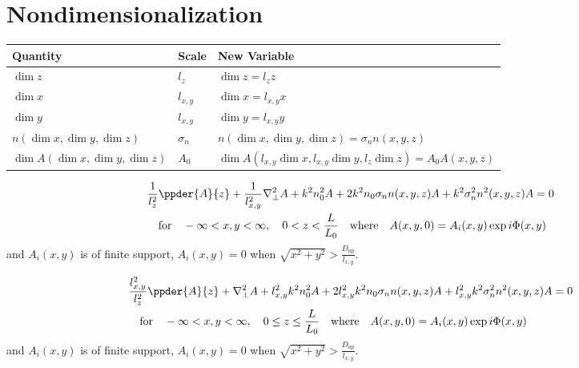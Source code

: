 \section{Nondimensionalization}
\begin{center}
\begin{tabular}{ |p{3cm}|p{2cm}|p{6cm}| }
\hline
\textbf{Quantity} & \textbf{Scale} & \textbf{New Variable}\\
\hline
\hline
$\dim{z}$                            & $l_{z}$    & $\dim{z} = l_{z} z$\\
\hline
$\dim{x}$                            & $l_{x,y}$  & $\dim{x} = l_{x,y} x$\\
\hline
$\dim{y}$                            & $l_{x,y}$  & $\dim{y} = l_{x,y} y$\\
\hline
$n(\dim{x}, \dim{y}, \dim{z})$       & $\sigma_n$ & $n(\dim{x}, \dim{y}, \dim{z}) = \sigma_n n(x,y,z)$\\
\hline
$\dim{A}(\dim{x}, \dim{y}, \dim{z})$ & $A_0$      & $\dim{A}(l_{x,y} \dim{x}, l_{x,y} \dim{y}, l_{z} \dim{z}) = A_0 A(x,y,z)$  \\
\hline
\end{tabular}
\end{center}

 \begin{equation}\label{EQ:helmholtz_equation_2}
 \begin{split}
   & \frac{1}{l_{z}^{2}} \ppder{A}{z} + \frac{1}{l_{x,y}^{2}} \nabla_{\perp}^2 A + k^2 n_0^2 A +  2 k^2 n_0 \sigma_n n(x,y,z) A + k^2 \sigma_n^2 n^2(x,y,z) A = 0 \\
   &\quad  \mbox{for}
   \quad -\infty < x,y < \infty, \quad 0 < z < \frac{L}{L_0} \quad  \mbox{where} \quad A(x,y,0) = A_{i}(x,y)\exp{i \Phi(x,y)}
 \end{split}
 \end{equation}
 and $A_{i}(x,y)$ is of finite support, \ie $A_{i}(x,y) = 0$ when $\sqrt{x^2 + y^2} > \frac{D_{ap}}{l_{x,y}}$.



\begin{equation}\label{EQ:helmholtz_equation_3}
\begin{split}
  & \frac{l_{x,y}^{2}}{l_{z}^{2}} \ppder{A}{z} + \nabla_{\perp}^2 A + l_{x,y}^{2} k^2 n_0^2 A 
  +  2 l_{x,y}^{2} k^2 n_0 \sigma_n n(x,y,z) A + l_{x,y}^{2} k^2 \sigma_n^2 n^2(x,y,z) A = 0 \\
  &\quad  \mbox{for}   
  \quad -\infty < x,y < \infty, \quad 0 \leq z \leq \frac{L}{L_0} \quad  
  \mbox{where} \quad A(x,y,0) = A_{i}(x,y)\exp{i \Phi(x,y)}
\end{split}
\end{equation}
and $A_{i}(x,y)$ is of finite support, \ie $A_{i}(x,y) = 0$ when $\sqrt{x^2 + y^2} > \frac{D_{ap}}{l_{x,y}}$.

